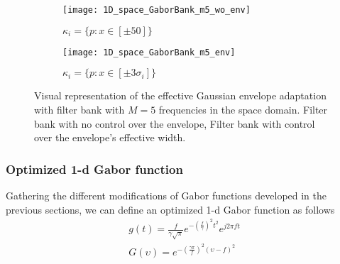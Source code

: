 \begin{figure}[!ht] 
	\centering
	\begin{subfigure}[b]{0.45\textwidth}
		\centering
		\texttt{[image: 1D\_space\_GaborBank\_m5\_wo\_env]}
		\caption{$\kappa_{i} = \lbrace p: x \in [\pm 50] \rbrace$}
		\label{fig:1D_space_Gaborfilterbank_wo_env}
	\end{subfigure}
	\qquad %
	\begin{subfigure}[b]{0.45\textwidth}
		\centering
		\texttt{[image: 1D\_space\_GaborBank\_m5\_env]}
		\caption{$\kappa_{i} = \lbrace p: x \in [\pm 3\sigma_{i}] \rbrace$}
		\label{fig:1D_space_Gaborfilterbank_env}
	\end{subfigure}

  \caption{Visual representation of the effective Gaussian envelope adaptation with filter bank with $M = 5$ frequencies in the space domain.  Filter bank with no control over the envelope,  Filter bank with control over the envelope's effective width.}
  \label{fig:1D_space_Gaborfilterbank}
\end{figure}


\subsubsection{Optimized 1-d Gabor function}
Gathering the different modifications of Gabor functions developed in the previous sections, we can define an optimized 1-d Gabor function as follows
\begin{equation}\label{eq:gabor_function_1d_timefreq_bank}
    \begin{gathered}
         g(t) =  \frac{f}{\gamma \sqrt{\pi}} e ^{-\left(\frac{f}{\gamma}\right)^2 t^2} e ^{j 2 \pi f t } \\
         G(\upsilon) =  e ^{-\left(\frac{\gamma \pi}{f}\right) ^2 (\upsilon-f)^2}
     \end{gathered}
\end{equation}


